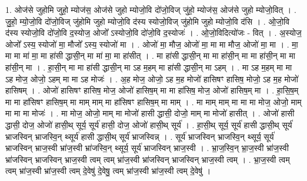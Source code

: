 \documentclass[17pt]{extarticle}
\begin{document}
1. ओज॑से जुहोमि जुहो॒ म्योज॑स॒ ओज॑से जुहो म्योजो॒वि दो॑जो॒विज् जु॑हो॒ म्योज॑स॒ ओज॑से जुहो म्योजो॒वित् । . जु॒हो॒ म्यो॒जो॒वि दो॑जो॒विज् जु॑होमि जुहो म्योजो॒वि द॑स्य स्योजो॒विज् जु॑होमि जुहो म्योजो॒वि द॑सि । . ओ॒जो॒वि द॑स्य स्योजो॒वि दो॑जो॒वि द॒स्योज॒ ओजो᳚ ऽस्योजो॒वि दो॑जो॒वि द॒स्योजः॑ । . ओ॒जो॒विदित्यो॑जः - वित् । . अ॒स्योज॒ ओजो᳚ ऽस्य॒ स्योजो॑ मा॒ मौजो᳚ ऽस्य॒ स्योजो॑ मा । . ओजो॑ मा॒ मौज॒ ओजो॑ मा॒ मा मा मौज॒ ओजो॑ मा॒ मा । . मा॒ मा मा मा॑ मा॒ मा हा॑सी द्धासी॒न् मा मा॑ मा॒ मा हा॑सीत् । . मा हा॑सी द्धासी॒न् मा मा हा॑सी॒न् मा मा हा॑सी॒न् मा मा हा॑सी॒न् मा । . हा॒सी॒न् मा मा हा॑सी द्धासी॒न् मा ऽह म॒हम् मा हा॑सी द्धासी॒न् मा ऽहम् । . मा ऽह म॒हम् मा मा ऽह मोज॒ ओजो॒ ऽहम् मा मा ऽह मोजः॑ । . अ॒ह मोज॒ ओजो॒ ऽह म॒ह मोजो॑ हासिषꣳ हासिष॒ मोजो॒ ऽह म॒ह मोजो॑ हासिषम् । . ओजो॑ हासिषꣳ हासिष॒ मोज॒ ओजो॑ हासिष॒म् मा मा हा॑सिष॒ मोज॒ ओजो॑ हासिष॒म् मा । . हा॒सि॒ष॒म् मा मा हा॑सिषꣳ हासिष॒म् मा माम् माम् मा हा॑सिषꣳ हासिष॒म् मा माम् । . मा माम् माम् मा मा मा मोज॒ ओजो॒ माम् मा मा मा मोजः॑ । . मा मोज॒ ओजो॒ माम् मा मोजो॑ हासी द्धासी॒ दोजो॒ माम् मा मोजो॑ हासीत् । . ओजो॑ हासी द्धासी॒ दोज॒ ओजो॑ हासी॒थ् सूर्य॒ सूर्य॑ हासी॒ दोज॒ ओजो॑ हासी॒थ् सूर्य॑ । . हा॒सी॒थ् सूर्य॒ सूर्य॑ हासी द्धासी॒थ् सूर्य॑ भ्राजस्विन् भ्राजस्वि॒न् थ्सूर्य॑ हासी द्धासी॒थ् सूर्य॑ भ्राजस्विन्न् । . सूर्य॑ भ्राजस्विन् भ्राजस्वि॒न् थ्सूर्य॒ सूर्य॑ भ्राजस्विन् भ्राज॒स्वी भ्रा॑ज॒स्वी भ्रा॑जस्वि॒न् थ्सूर्य॒ सूर्य॑ भ्राजस्विन् भ्राज॒स्वी । . भ्रा॒ज॒स्वि॒न् भ्रा॒ज॒स्वी भ्रा॑ज॒स्वी भ्रा॑जस्विन् भ्राजस्विन् भ्राज॒स्वी त्वम् त्वम् भ्रा॑ज॒स्वी भ्रा॑जस्विन् भ्राजस्विन् भ्राज॒स्वी त्वम् । . भ्रा॒ज॒स्वी त्वम् त्वम् भ्रा॑ज॒स्वी भ्रा॑ज॒स्वी त्वम् दे॒वेषु॑ दे॒वेषु॒ त्वम् भ्रा॑ज॒स्वी भ्रा॑ज॒स्वी त्वम् दे॒वेषु॑ । \newline
\end{document}
